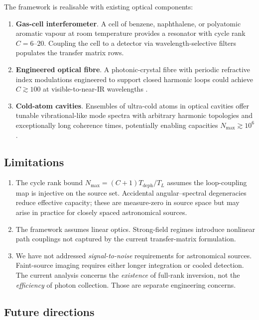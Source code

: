 \documentclass[11pt,twocolumn,a4paper]{article}
\theoremstyle{definition}
\theoremstyle{remark}
\begin{document}
The framework is realisable with existing optical components:

\begin{enumerate}[nosep]
\item \textbf{Gas-cell interferometer}. A cell of benzene, naphthalene, or polyatomic aromatic vapour at room temperature provides a resonator with cycle rank $C = 6$--$20$. Coupling the cell to a detector via wavelength-selective filters populates the transfer matrix rows.
\item \textbf{Engineered optical fibre}. A photonic-crystal fibre with periodic refractive index modulations engineered to support closed harmonic loops could achieve $C \gtrsim 100$ at visible-to-near-IR wavelengths \citep{russell2003}.
\item \textbf{Cold-atom cavities}. Ensembles of ultra-cold atoms in optical cavities offer tunable vibrational-like mode spectra with arbitrary harmonic topologies and exceptionally long coherence times, potentially enabling capacities $N_{\max} \gtrsim 10^6$.
\end{enumerate}

\subsection{Limitations}

\begin{enumerate}[nosep]
\item The cycle rank bound $N_{\max} = (C+1) T_{\mathrm{deph}}/T_L$ assumes the loop-coupling map is injective on the source set. Accidental angular--spectral degeneracies reduce effective capacity; these are measure-zero in source space but may arise in practice for closely spaced astronomical sources.
\item The framework assumes linear optics. Strong-field regimes introduce nonlinear path couplings not captured by the current transfer-matrix formulation.
\item We have not addressed \emph{signal-to-noise} requirements for astronomical sources. Faint-source imaging requires either longer integration or cooled detection. The current analysis concerns the \emph{existence} of full-rank inversion, not the \emph{efficiency} of photon collection. Those are separate engineering concerns.
\end{enumerate}

\subsection{Future directions}
\end{document}
